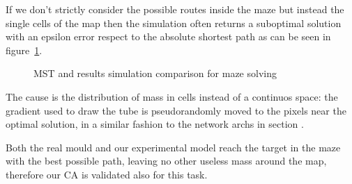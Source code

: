 \par
If we don't strictly consider the possible routes inside the maze but instead the single cells of the map then the simulation often returns a suboptimal solution with an epsilon error respect to the absolute shortest path as can be seen in figure~\ref{fig:mst_tube}.

\begin{figure}[H]
    \centering
    \caption{MST and results simulation comparison for maze solving}
    \label{fig:mst_tube}
\end{figure}

\par
The cause is the distribution of mass in cells instead of a continuos space: the gradient used to draw the tube is pseudorandomly moved to the pixels near the optimal solution, in a similar fashion to the network archs in section .

\par
Both the real mould and our experimental model reach the target in the maze with the best possible path, leaving no other useless mass around the map, therefore our CA is validated also for this task.
